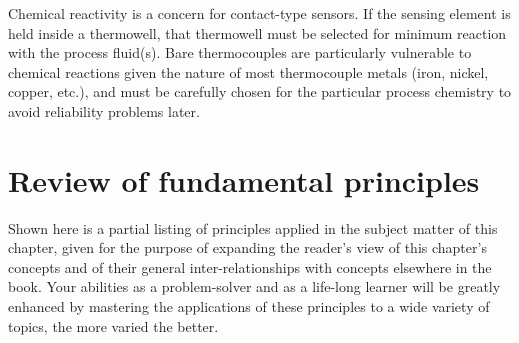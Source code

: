 \vskip 10pt

Chemical reactivity is a concern for contact-type sensors.  If the sensing element is held inside a thermowell, that thermowell must be selected for minimum reaction with the process fluid(s).  Bare thermocouples are particularly vulnerable to chemical reactions given the nature of most thermocouple metals (iron, nickel, copper, etc.), and must be carefully chosen for the particular process chemistry to avoid reliability problems later.







\filbreak
\section{Review of fundamental principles}

Shown here is a partial listing of principles applied in the subject matter of this chapter, given for the purpose of expanding the reader's view of this chapter's concepts and of their general inter-relationships with concepts elsewhere in the book.  Your abilities as a problem-solver and as a life-long learner will be greatly enhanced by mastering the applications of these principles to a wide variety of topics, the more varied the better.

